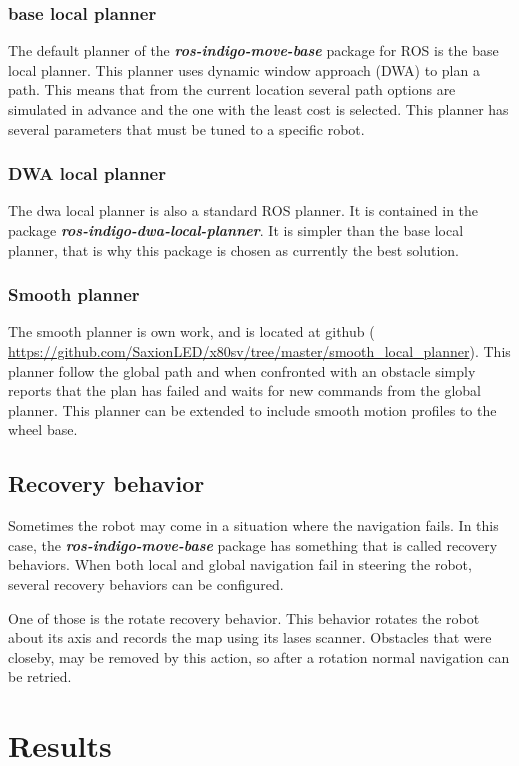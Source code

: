 \documentclass[a4paper]{article}
\newcommand{\rospackage}[1]{\textbf{\textit{ros-indigo-#1}}}
\begin{document}
\subsubsection{base local planner}
The default planner of the \rospackage{move-base} package for ROS is the base local planner.
This planner uses dynamic window approach (DWA) to plan a path. This means that from the current 
location several path options are simulated in advance and the one with the least cost is selected.
This planner has several parameters that must be tuned to a specific robot.

\subsubsection{DWA local planner}
The dwa local planner is also a standard ROS planner. It is contained in the package
\rospackage{dwa-local-planner}.
It is simpler than the base local planner,
that is why this package is chosen as currently the best solution.

\subsubsection{Smooth planner}
The smooth planner is own work, and is located at github (
\url{https://github.com/SaxionLED/x80sv/tree/master/smooth_local_planner}).
This planner follow the global path and when confronted with an obstacle simply
reports that the plan has failed and waits for new commands from the global planner.
This planner can be extended to include smooth motion profiles to the wheel base.

\subsection{Recovery behavior}
Sometimes the robot may come in a situation where the navigation fails. In this case, the 
\rospackage{move-base} package
has something that is called recovery behaviors. When both local and global navigation fail in
steering the robot, several recovery behaviors can be configured.

One of those is the rotate
recovery behavior. This behavior rotates the robot about its axis and records the map using its lases
scanner. Obstacles that were closeby, may be removed by this action, so after a rotation normal navigation
can be retried.

\section{Results}
\end{document}
